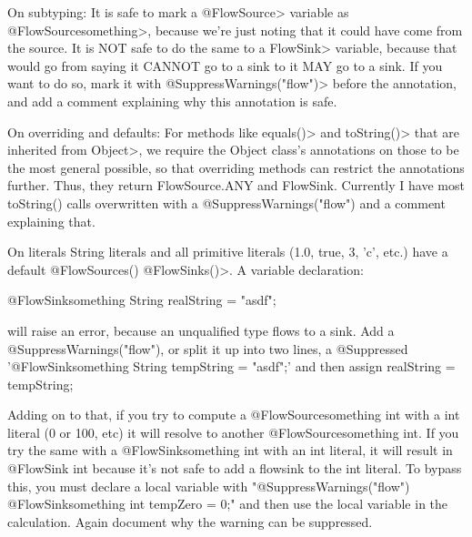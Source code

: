 On subtyping:
It is safe to mark a \<@FlowSource{}> variable as
 \<@FlowSource{something}>, because we're just noting that it could have
 come from the source. It is NOT safe to do the same to a \<FlowSink{}>
 variable, because that would go from saying it CANNOT go to a sink to
 it MAY go to a sink. If you want to do so, mark it with
 \<@SuppressWarnings("flow")> before the annotation, and add a comment
 explaining why this annotation is safe.


On overriding and defaults:
For methods like \<equals()> and \<toString()> that are inherited from
 \<Object>, we require the Object class's annotations on those to be the
 most general possible, so that overriding methods can restrict the
 annotations further. Thus, they return FlowSource.ANY and
 FlowSink{}. Currently I have most toString() calls overwritten with a
 @SuppressWarnings("flow") and a comment explaining that. 

On literals
String literals and all primitive literals (1.0, true, 3, 'c',
 etc.) have a default \<@FlowSources({}) @FlowSinks({})>.
 A variable declaration:

 @FlowSink{something} String realString = "asdf";

 will raise an error, because an unqualified type flows to a sink.
 Add a @SuppressWarnings("flow"), or split it up into two
 lines, a @Suppressed '@FlowSink{something} String tempString =
 "asdf";' and then assign realString = tempString;

Adding on to that, if you try to compute a @FlowSource{something} int
 with a int literal (0 or 100, etc) it will resolve to another
 @FlowSource{something} int. If you try the same with a
 @FlowSink{something} int with an int literal, it will result in
 @FlowSink{} int because it's not safe to add a flowsink to the int
 literal. To bypass this, you must declare a local variable with
 "@SuppressWarnings("flow") @FlowSink{something} int tempZero = 0;"
 and then use the local variable in the calculation.
 Again document why the warning can be suppressed.



